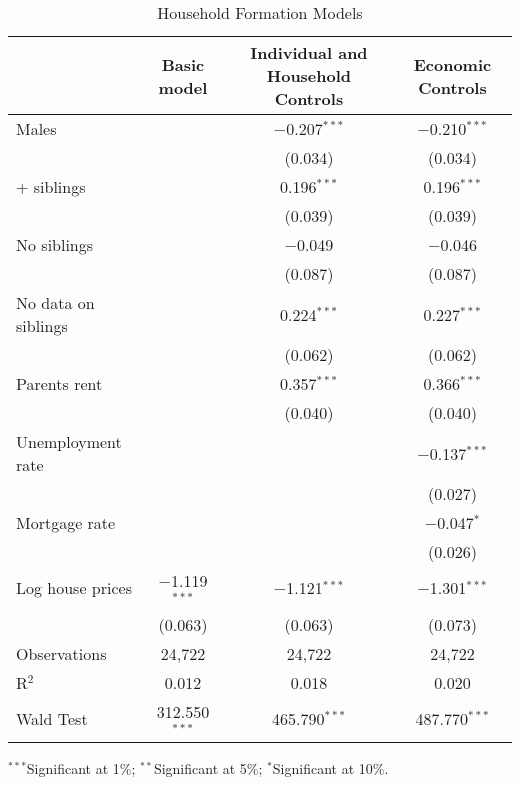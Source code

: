 
\begin{table}[!htbp] \centering 
  \begin{threeparttable}
  \caption{Household Formation Models} 
  \label{main-res} 
\begin{tabular}{@{\extracolsep{1pt}}lccc} 
\toprule
\parbox[t]{0.28\textwidth}{\centering } & \parbox[t]{0.18\textwidth}{\centering Basic model} & \parbox[t]{0.23\textwidth}{\centering Individual and Household Controls} & \parbox[t]{0.18\textwidth}{\centering Economic Controls} \\
\midrule
 Males &  & $-$0.207$^{***}$ & $-$0.210$^{***}$ \\ 
  &  & (0.034) & (0.034) \\ 
+ siblings &  & 0.196$^{***}$ & 0.196$^{***}$ \\ 
  &  & (0.039) & (0.039) \\ 
\addlinespace[0.5em]
 No siblings &  & $-$0.049 & $-$0.046 \\ 
  &  & (0.087) & (0.087) \\ 
\addlinespace[0.5em]
 No data on siblings &  & 0.224$^{***}$ & 0.227$^{***}$ \\ 
  &  & (0.062) & (0.062) \\ 
\addlinespace[0.5em]
 Parents rent &  & 0.357$^{***}$ & 0.366$^{***}$ \\ 
  &  & (0.040) & (0.040) \\ 
\addlinespace[0.5em]
 Unemployment rate &  &  & $-$0.137$^{***}$ \\ 
  &  &  & (0.027) \\ 
\addlinespace[0.5em]
 Mortgage rate &  &  & $-$0.047$^{*}$ \\ 
  &  &  & (0.026) \\ 
\addlinespace[0.5em]
 Log house prices & $-$1.119$^{***}$ & $-$1.121$^{***}$ & $-$1.301$^{***}$ \\ 
  & (0.063) & (0.063) & (0.073) \\ 
\addlinespace[0.5em]
Observations & 24,722 & 24,722 & 24,722 \\ 
R$^{2}$ & 0.012 & 0.018 & 0.020 \\ 
Wald Test & 312.550$^{***}$ & 465.790$^{***}$ & 487.770$^{***}$ \\ 
\bottomrule
\end{tabular} 
  \begin{tablenotes}[flushleft]
  \item $^{***}$Significant at 1\%; $^{**}$Significant at 5\%; $^{*}$Significant at 10\%.
  \end{tablenotes}
  \end{threeparttable}
\end{table} 
